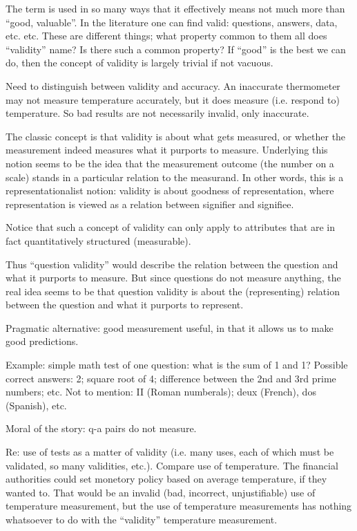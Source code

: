 \documentclass[11pt,twoside]{article}
\begin{document}
The term is used in so many ways that it effectively means not much
more than \enquote{good, valuable}.  In the literature one can find
valid: questions, answers, data, etc. etc.  These are different
things; what property common to them all does \enquote{validity} name?
Is there such a common property?  If \enquote{good} is the best we can
do, then the concept of validity is largely trivial if not vacuous.

Need to distinguish between validity and accuracy.  An inaccurate
thermometer may not measure temperature accurately, but it does
measure (i.e. respond to) temperature.  So bad results are not
necessarily invalid, only inaccurate.

The classic concept is that validity is about what gets measured, or
whether the measurement indeed measures what it purports to measure.
Underlying this notion seems to be the idea that the measurement
outcome (the number on a scale) stands in a particular relation to the
measurand.  In other words, this is a representationalist notion:
validity is about goodness of representation, where representation is
viewed as a relation between signifier and signifiee.

Notice that such a concept of validity can only apply to attributes
that are in fact quantitatively structured (measurable).

Thus ``question validity'' would describe the relation between the
question and what it purports to measure.  But since questions do not
measure anything, the real idea seems to be that question validity is
about the (representing) relation between the question and what it
purports to represent.

Pragmatic alternative: good measurement useful, in that it allows us
to make good predictions.

Example: simple math test of one question: what is the sum of 1 and 1?
Possible correct answers: 2; square root of 4; difference between the
2nd and 3rd prime numbers; etc.  Not to mention: II (Roman numberals);
deux (French), dos (Spanish), etc.

Moral of the story:  q-a pairs do not measure.

Re: use of tests as a matter of validity (i.e. many uses, each of
which must be validated, so many validities, etc.).  Compare use of
temperature.  The financial authorities could set monetory policy
based on average temperature, if they wanted to.  That would be an
invalid (bad, incorrect, unjustifiable) use of temperature
measurement, but the use of temperature measurements has nothing
whatsoever to do with the \enquote{validity} temperature measurement.
\end{document}
